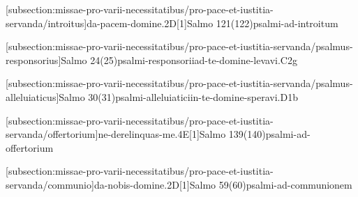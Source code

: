 \def\Prefix{subsection:missae-pro-varii-necessitatibus/pro-pace-et-iustitia-servanda}

[\Prefix/introitus]{da-pacem-domine.2D}[1]{Salmo 121(122)}{psalmi-ad-introitum}

[\Prefix/psalmus-responsorius]{Salmo 24(25)}{psalmi-responsorii}{ad-te-domine-levavi.C2g}

\AllowPageFlush

[\Prefix/psalmus-alleluiaticus]{Salmo 30(31)}{psalmi-alleluiatici}{in-te-domine-speravi.D1b}

\AllowPageFlush

[\Prefix/offertorium]{ne-derelinquas-me.4E}[1]{Salmo 139(140)}{psalmi-ad-offertorium}

\AllowPageFlush

[\Prefix/communio]{da-nobis-domine.2D}[1]{Salmo 59(60)}{psalmi-ad-communionem}